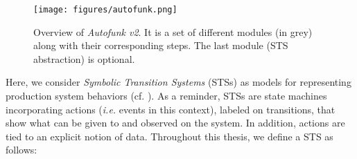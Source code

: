\begin{figure}[ht]
    \begin{center}
        \texttt{[image: figures/autofunk.png]}
    \end{center}

    \caption{Overview of \textit{Autofunk v2}. It is a set of
    different modules (in grey) along with their corresponding
    steps. The last module (STS abstraction) is optional.}
    \label{fig:prodsystems:autofunk-overview}
\end{figure}

Here, we consider \textit{Symbolic Transition Systems} (STSs) as
models for representing production system behaviors (cf.
).  As a reminder,
STSs are state machines incorporating actions (\emph{i.e.} events
in this context), labeled on transitions, that show what can be
given to and observed on the system. In addition, actions are
tied to an explicit notion of data. Throughout this thesis, we
define a STS as follows:

